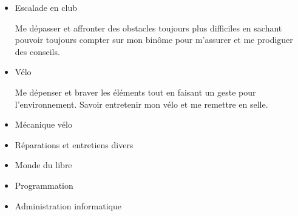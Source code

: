\documentclass[10pt,a4paper,ragged2e,withhyper,normalphoto]{altacv}
\begin{document}
\begin{paracol}{2}
\begin{itemize}
	\item[\faAngleDoubleUp] Escalade en club\par%
	Me dépasser et affronter des obstacles toujours plus difficiles en sachant pouvoir toujours compter sur mon binôme pour m'assurer et me prodiguer des conseils.
	\item[\faBiking] Vélo\par%
	Me dépenser et braver les éléments tout en faisant un geste pour l'environnement. Savoir entretenir mon vélo et me remettre en selle.
\end{itemize}
	
\begin{itemize}
	\item Mécanique vélo
	\item Réparations et entretiens divers
\end{itemize}

\begin{itemize}
	\item Monde du libre
	\item Programmation
	\item Administration informatique
\end{itemize}
	
\newpage

\end{paracol}
\end{document}
